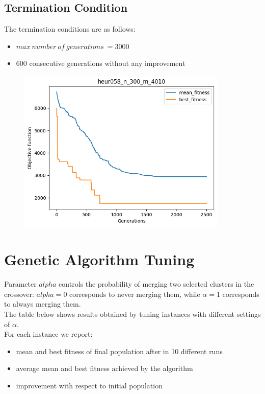 \documentclass[a4paper,12pt]{article}
\begin{document}
\subsection*{Termination Condition}
The termination conditions are as follows:
\begin{itemize}
    \item $max\ number\ of\ generations\ = 3000$
    \item $600$ consecutive generations without any improvement
\end{itemize}

\begin{figure}[H]
\centering
\includegraphics[width=10cm]{graphics/grafico1.png}
\end{figure}

\section*{Genetic Algorithm Tuning}
Parameter $alpha$ controls the probability of merging two selected clusters in the crossover: $alpha=0$ corresponds to never merging them, while $\alpha=1$ corresponds to always merging them.\\
The table below shows results obtained by tuning instances with different settings of $\alpha$.\\
For each instance we report:
\begin{itemize}
    \item mean and best fitness of final population after in 10 different runs
    \item average mean and best fitness achieved by the algorithm
    \item improvement with respect to initial population
\end{itemize}
\end{document}
